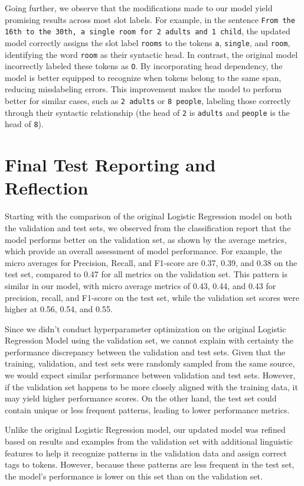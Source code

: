 \documentclass[11pt,a4paper]{article}
\begin{document}
Going further, we observe that the modifications made to our model yield promising results across most slot labels. For example, in the sentence \texttt{From the 16th to the 30th, a single room for 2 adults and 1 child}, the updated model correctly assigns the slot label \texttt{rooms} to the tokens \texttt{a}, \texttt{single}, and \texttt{room}, identifying the word \texttt{room} as their syntactic head. In contrast, the original model incorrectly labeled these tokens as \texttt{O}. By incorporating head dependency, the model is better equipped to recognize when tokens belong to the same span, reducing misslabeling errors. This improvement makes the model to perform better for similar cases, such as \texttt{2 adults} or \texttt{8 people}, labeling those correctly through their syntactic relationship (the head of \texttt{2} is \texttt{adults} and \texttt{people} is the head of \texttt{8}).
\pagebreak
\section{Final Test Reporting and Reflection}

Starting with the comparison of the original Logistic Regression model on both the validation and test sets, we observed from the classification report that the model performs better on the validation set, as shown by the average metrics, which provide an overall assessment of model performance. For example, the micro averages for Precision, Recall, and F1-score are 0.37, 0.39, and 0.38 on the test set, compared to 0.47 for all metrics on the validation set. This pattern is similar in our model, with micro average metrics of 0.43, 0.44, and 0.43 for precision, recall, and F1-score on the test set, while the validation set scores were higher at 0.56, 0.54, and 0.55.

Since we didn’t conduct hyperparameter optimization on the original Logistic Regression Model using the validation set, we cannot explain with certainty the performance discrepancy between the validation and test sets. Given that the training, validation, and test sets were randomly sampled from the same source, we would expect similar performance between validation and test sets. However, if the validation set happens to be more closely aligned with the training data, it may yield higher performance scores. On the other hand, the test set could contain unique or less frequent patterns, leading to lower performance metrics.

Unlike the original Logistic Regression model, our updated model was refined based on results and examples from the validation set with additional linguistic features to help it recognize patterns in the validation data and assign correct tags to tokens. However, because these patterns are less frequent in the test set, the model’s performance is lower on this set than on the validation set.
\end{document}
